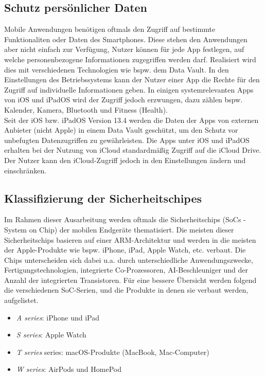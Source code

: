 \subsection{Schutz persönlicher Daten}
Mobile Anwendungen benötigen oftmals den Zugriff auf bestimmte Funktionaliten oder Daten des Smartphones.
Diese stehen den Anwendungen aber nicht einfach zur Verfügung, Nutzer können für jede App festlegen, auf 
welche personenbezogene Informationen zugegriffen werden darf. Realisiert wird dies mit verschiedenen Technologien 
wie bspw. dem Data Vault. In den Einstellungen des Betriebssystems kann der Nutzer einer App die Rechte für den Zugriff 
auf individuelle Informationen geben. In einigen systemrelevanten Apps von iOS und iPadOS wird der Zugriff jedoch erzwungen, 
dazu zählen bspw. Kalender, Kamera, Bluetooth und Fitness (Health). \cite{apple2020} \\ 

Seit der iOS bzw. iPadOS Version 13.4 werden die Daten der Apps von externen Anbieter (nicht Apple) in einem Data Vault geschützt, 
um den Schutz vor unbefugten Datenzugriffen zu gewährleisten. Die Apps unter iOS und iPadOS erhalten bei der Nutzung von iCloud 
standardmäßig Zugriff auf die iCloud Drive. Der Nutzer kann den iCloud-Zugriff jedoch in den Einstellungen ändern und einschränken. \cite{apple2020}

\subsection{Klassifizierung der Sicherheitschipes}
Im Rahmen dieser Ausarbeitung werden oftmals die Sicherheitschips (SoCs - System on Chip) der mobilen Endgeräte thematisiert. 
Die meisten dieser Sicherheitschips basieren auf einer ARM-Architektur und werden in die meisten der Apple-Produkte wie bspw.
iPhone, iPad, Apple Watch, etc. verbaut. Die Chips unterscheiden sich dabei u.a. durch unterschiedliche Anwendungszwecke, 
Fertigungstechnologien, integrierte Co-Prozessoren, AI-Beschleuniger und der Anzahl der integrierten Transistoren. Für eine 
bessere Übersicht werden folgend die verschiedenen SoC-Serien, und die Produkte in denen sie verbaut werden, aufgelistet. \cite{apple2020}

\begin{itemize}
\item \textit{A series}: iPhone und iPad
\item \textit{S series}: Apple Watch
\item \textit{T series} series: macOS-Produkte (MacBook, Mac-Computer)
\item \textit{W series}: AirPods und HomePod
\end{itemize}




